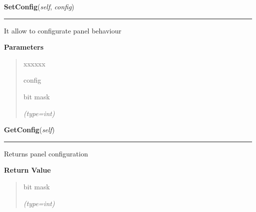     \label{ImagePanel:ImagePanel:SetConfig}

    \vspace{0.5ex}

\hspace{.8\funcindent}\begin{boxedminipage}{\funcwidth}

    \raggedright \textbf{SetConfig}(\textit{self}, \textit{config})

    \vspace{-1.5ex}

    \rule{\textwidth}{0.5\fboxrule}
\setlength{\parskip}{2ex}
    It allow to configurate panel behaviour

\setlength{\parskip}{1ex}
      \textbf{Parameters}
      \vspace{-1ex}

      \begin{quote}
        \begin{Ventry}{xxxxxx}

          \item[config]

          bit mask

            {\it (type=int)}

        \end{Ventry}

      \end{quote}

    \end{boxedminipage}

    \label{ImagePanel:ImagePanel:GetConfig}

    \vspace{0.5ex}

\hspace{.8\funcindent}\begin{boxedminipage}{\funcwidth}

    \raggedright \textbf{GetConfig}(\textit{self})

    \vspace{-1.5ex}

    \rule{\textwidth}{0.5\fboxrule}
\setlength{\parskip}{2ex}
    Returns panel configuration

\setlength{\parskip}{1ex}
      \textbf{Return Value}
    \vspace{-1ex}

      \begin{quote}
      bit mask

      {\it (type=int)}

      \end{quote}

    \end{boxedminipage}

